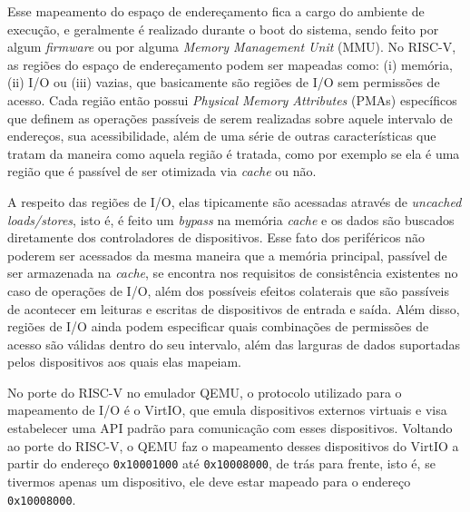 		Esse mapeamento do espaço de endereçamento fica a cargo do ambiente de execução, e geralmente é
		realizado durante o boot do sistema, sendo feito por algum \textit{firmware} ou por alguma
		\textit{Memory Management Unit} (MMU). No RISC-V, as regiões do espaço de endereçamento podem
		ser mapeadas como: (i) memória, (ii) I/O ou (iii) vazias, que basicamente são regiões de I/O sem
		permissões de acesso. Cada região então possui \textit{Physical Memory Attributes} (PMAs) específicos
		que definem as operações passíveis de serem realizadas sobre aquele intervalo de endereços, sua
		acessibilidade, além de uma série de outras características que tratam da maneira como aquela região
		é tratada, como por exemplo se ela é uma região que é passível de ser otimizada via \textit{cache}
		ou não.

		A respeito das regiões de I/O, elas tipicamente são acessadas através de \textit{uncached loads/stores},
		isto é, é feito um \textit{bypass} na memória \textit{cache} e os dados são buscados diretamente
		dos controladores de dispositivos. Esse fato dos periféricos não poderem ser acessados da mesma
		maneira que a memória principal, passível de ser armazenada na \textit{cache}, se encontra
		nos requisitos de consistência existentes no caso de operações de I/O, além dos possíveis efeitos
		colaterais que são passíveis de acontecer em leituras e escritas de dispositivos de entrada
		e saída. Além disso, regiões de I/O ainda podem especificar quais combinações de permissões de
		acesso são válidas dentro do seu intervalo, além das larguras de dados suportadas pelos dispositivos
		aos quais elas mapeiam.

		No porte do RISC-V no emulador QEMU, o protocolo utilizado para o mapeamento de I/O é o VirtIO, que
		emula dispositivos externos virtuais e visa estabelecer uma API padrão para comunicação com esses
		dispositivos. Voltando ao porte do RISC-V, o QEMU faz o mapeamento desses dispositivos do VirtIO
		a partir do endereço \texttt{0x10001000} até \texttt{0x10008000}, de trás para frente, isto é, se
		tivermos apenas um dispositivo, ele deve estar mapeado para o endereço \texttt{0x10008000}.

